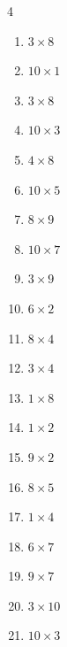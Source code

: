 \begin{multicols}{4}
\begin{enumerate}
  \item $3\times 8$
        \phantom{$=24$}

  \item $10\times 1$
        \phantom{$=10$}

  \item $3\times 8$
        \phantom{$=24$}

  \item $10\times 3$
        \phantom{$=30$}

  \item $4\times 8$
        \phantom{$=32$}

  \item $10\times 5$
        \phantom{$=50$}

\columnbreak %

  \item $8\times 9$
        \phantom{$=72$}

  \item $10\times 7$
        \phantom{$=70$}

  \item $3\times 9$
        \phantom{$=27$}

  \item $6\times 2$
        \phantom{$=12$}

  \item $8\times 4$
        \phantom{$=32$}

  \item $3\times 4$
        \phantom{$=12$}

  \item $1\times 8$
        \phantom{$=8$}

  \item $1\times 2$
        \phantom{$=2$}

  \item $9\times 2$
        \phantom{$=18$}

  \item $8\times 5$
        \phantom{$=40$}

  \item $1\times 4$
        \phantom{$=4$}

  \item $6\times 7$
        \phantom{$=42$}

  \item $9\times 7$
        \phantom{$=63$}

  \item $3\times 10$
        \phantom{$=30$}

  \item $10\times 3$
        \phantom{$=30$}


\end{enumerate}
\end{multicols}
